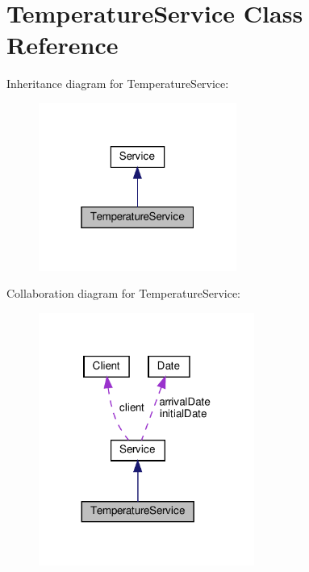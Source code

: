 \hypertarget{class_temperature_service}{}\section{Temperature\+Service Class Reference}
\label{class_temperature_service}


Inheritance diagram for Temperature\+Service\+:\nopagebreak
\begin{figure}[H]
\begin{center}
\leavevmode
\includegraphics[width=184pt]{class_temperature_service__inherit__graph}
\end{center}
\end{figure}


Collaboration diagram for Temperature\+Service\+:\nopagebreak
\begin{figure}[H]
\begin{center}
\leavevmode
\includegraphics[width=200pt]{class_temperature_service__coll__graph}
\end{center}
\end{figure}

